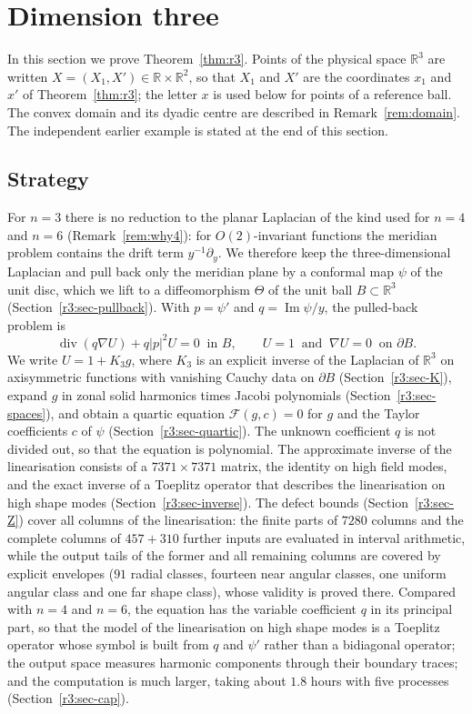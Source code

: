 \documentclass[11pt]{amsart}
\theoremstyle{definition}
\theoremstyle{remark}
\numberwithin{equation}{section}
\newcommand{\R}{\mathbb{R}}
\newcommand{\Fc}{\mathcal{F}}
\DeclareMathOperator{\im}{Im}
\begin{document}
\section{Dimension three}\label{r3:sec}\label{sec:r3}

In this section we prove Theorem~\ref{thm:r3}. Points of the physical space $\R^3$ are written $X=(X_1,X')\in\R\times\R^2$, so that $X_1$ and $X'$ are the coordinates $x_1$ and $x'$ of Theorem~\ref{thm:r3}; the letter $x$ is used below for points of a reference ball. The convex domain and its dyadic centre are described in Remark~\ref{rem:domain}. The independent earlier example is stated at the end of this section.

\subsection*{Strategy}
For $n=3$ there is no reduction to the planar Laplacian of the kind used for $n=4$ and $n=6$ (Remark~\ref{rem:why4}): for $O(2)$-invariant functions the meridian problem contains the drift term $y^{-1}\partial_y$. We therefore keep the three-dimensional Laplacian and pull back only the meridian plane by a conformal map $\psi$ of the unit disc, which we lift to a diffeomorphism $\Theta$ of the unit ball $B\subset\R^3$ (Section~\ref{r3:sec-pullback}). With $p=\psi'$ and $q=\im\psi/y$, the pulled-back problem is
\[
\operatorname{div}(q\nabla U)+q|p|^2U=0\ \text{ in }B,\qquad U=1\ \text{ and }\ \nabla U=0\ \text{ on }\partial B .
\]
We write $U=1+K_3g$, where $K_3$ is an explicit inverse of the Laplacian of $\R^3$ on axisymmetric functions with vanishing Cauchy data on $\partial B$ (Section~\ref{r3:sec-K}), expand $g$ in zonal solid harmonics times Jacobi polynomials (Section~\ref{r3:sec-spaces}), and obtain a quartic equation $\Fc(g,c)=0$ for $g$ and the Taylor coefficients $c$ of $\psi$ (Section~\ref{r3:sec-quartic}). The unknown coefficient $q$ is not divided out, so that the equation is polynomial. The approximate inverse of the linearisation consists of a $7371\times7371$ matrix, the identity on high field modes, and the exact inverse of a Toeplitz operator that describes the linearisation on high shape modes (Section~\ref{r3:sec-inverse}). The defect bounds (Section~\ref{r3:sec-Z}) cover all columns of the linearisation: the finite parts of $7280$ columns and the complete columns of $457+310$ further inputs are evaluated in interval arithmetic, while the output tails of the former and all remaining columns are covered by explicit envelopes ($91$ radial classes, fourteen near angular classes, one uniform angular class and one far shape class), whose validity is proved there. Compared with $n=4$ and $n=6$, the equation has the variable coefficient $q$ in its principal part, so that the model of the linearisation on high shape modes is a Toeplitz operator whose symbol is built from $q$ and $\psi'$ rather than a bidiagonal operator; the output space measures harmonic components through their boundary traces; and the computation is much larger, taking about $1.8$ hours with five processes (Section~\ref{r3:sec-cap}).
\end{document}
